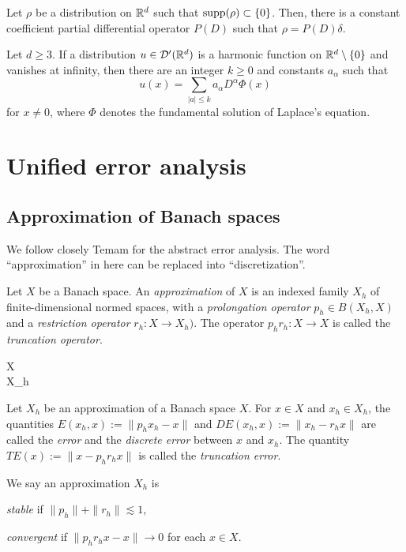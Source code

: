 \documentclass[a4paper]{article}
\begin{document}
\begin{lem*}
Let $\rho$ be a distribution on $\mathbb{R}^d$ such that $\operatorname{supp}(\rho)\subset\{0\}$.
Then, there is a constant coefficient partial differential operator $P(D)$ such that $\rho=P(D)\delta$.
\end{lem*}

\begin{cor*}
Let $d\ge3$.
If a distribution $u\in\mathcal{D}'(\mathbb{R}^d)$ is a harmonic function on $\mathbb{R}^d\setminus\{0\}$ and vanishes at infinity, then there are an integer $k\ge0$ and constants $a_\alpha$ such that
\[u(x)=\sum_{|a|\le k}a_\alpha D^\alpha\Phi(x)\]
for $x\ne0$, where $\Phi$ denotes the fundamental solution of Laplace's equation.
\end{cor*}




\newpage
\section{Unified error analysis}

\subsection{Approximation of Banach spaces}
We follow closely Temam for the abstract error analysis.
The word ``approximation'' in here can be replaced into ``discretization''.

\begin{defn}[Approximation]
Let $X$ be a Banach space.
An \emph{approximation} of $X$ is an indexed family $X_h$ of finite-dimensional normed spaces, with a \emph{prolongation operator} $p_h\in B(X_h,X)$ and a \emph{restriction operator} $r_h:X\to X_h)$.
The operator $p_hr_h:X\to X$ is called the \emph{truncation operator}.
\begin{cd}
X \\ X_h
\end{cd}
\end{defn}

\begin{defn}[Errors]
Let $X_h$ be an approximation of a Banach space $X$.
For $x\in X$ and $x_h\in X_h$, the quantities $E(x_h,x):=\|p_hx_h-x\|$ and $DE(x_h,x):=\|x_h-r_hx\|$ are called the \emph{error} and the \emph{discrete error} between $x$ and $x_h$.
The quantity $TE(x):=\|x-p_hr_hx\|$ is called the \emph{truncation error}.
\end{defn}

\begin{defn}
We say an approximation $X_h$ is
\begin{parts}
\item \emph{stable} if $\|p_h\|+\|r_h\|\lesssim1$,
\item \emph{convergent} if $\|p_hr_hx-x\|\to0$ for each $x\in X$.
\end{parts}
\end{defn}
\end{document}
